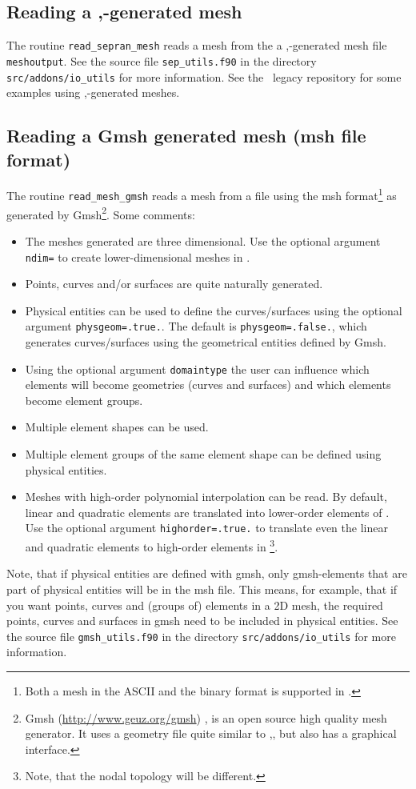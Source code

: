 \subsection{Reading a \sep-generated mesh}
\label{sec:readsepmesh}

The routine \texttt{read\_sepran\_mesh} reads a mesh from the a \sep-generated
mesh file \texttt{meshoutput}. See the source file \texttt{sep\_utils.f90} in the directory
\texttt{src/addons/io\_utils} for more information.
See the \tfem\ legacy repository for some
examples using \sep-generated meshes.


\subsection{Reading a Gmsh generated mesh (msh file format)}
\label{sec:readgmshmesh}

The routine \texttt{read\_mesh\_gmsh} reads a mesh from a file using
the msh format\footnote{Both a mesh in the ASCII and the binary format is
supported in \tfem.}
as generated by Gmsh\footnote{Gmsh
(\href{http://www.geuz.org/gmsh}{http://www.geuz.org/gmsh})
 \cite{Geuzaine09}, is an open source high quality mesh generator.
It uses a geometry file quite similar to \sep, but also has a graphical
interface.}. Some comments:
\begin{itemize}
\item The meshes generated are three dimensional. Use the optional argument
\texttt{ndim=} to create lower-dimensional meshes in \tfem.
\item Points, curves and/or surfaces are quite naturally generated.
\item  Physical entities can be used to
define the curves/surfaces
 using the optional argument \texttt{physgeom=.true.}. The
default is \texttt{physgeom=.false.}, which generates curves/surfaces using the
geometrical entities defined by Gmsh.
\item Using the optional argument \texttt{domaintype} the user can influence
which elements will become geometries (curves and surfaces) and which elements become
element groups.
\item Multiple element shapes can be used.
\item Multiple element groups of the same
element shape can be defined using physical entities.
\item Meshes with high-order polynomial interpolation can be read. By default, linear and quadratic elements are translated into lower-order elements of \tfem. Use the optional argument \texttt{highorder=.true.} to translate even the linear and quadratic elements to high-order elements in \tfem\footnote{Note, that the nodal topology will be different.}.
\end{itemize}
Note, that if physical entities are defined with gmsh,
only gmsh-elements that are part of physical entities will be in the msh file.
This means, for example, that if you want points, curves and (groups of)
elements in a 2D mesh, the required
points, curves and surfaces in gmsh need to be included in physical entities.
See the source file \texttt{gmsh\_utils.f90} in the directory
\texttt{src/addons/io\_utils} for more information.

